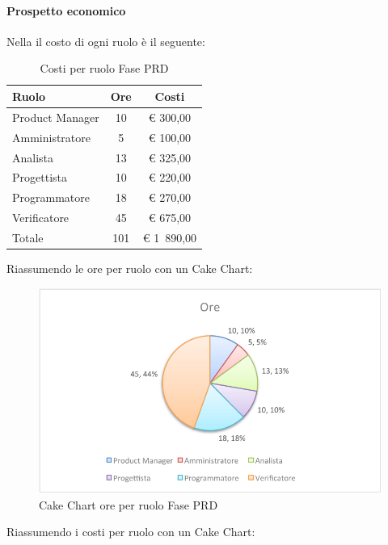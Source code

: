 			\paragraph{Prospetto economico}
				Nella  il costo di ogni ruolo è il seguente:
				\begin{table}[H]
					\begin{center}
						\begin{tabular}{| l | c | c |}
							\hline
							Ruolo 			& Ore 	& Costi  \\ \hline
							
							Product Manager	& 10 		& \euro{} 300,00 	\\
							Amministratore 		& 5 		& \euro{} 100,00 	\\
							Analista	 		& 13 		& \euro{} 325,00 	\\
							Progettista 		& 10 		& \euro{} 220,00  	\\
							Programmatore		& 18		& \euro{} 270,00 	\\
							Verificatore		& 45 		& \euro{} 675,00 	\\ \hline \hline
							
							Totale	 		& 101 	& \euro{} 1~890,00 	\\ \hline
						\end{tabular}
					\end{center}
					\caption{Costi per ruolo Fase PRD}
				\end{table}
				Riassumendo le ore per ruolo con un Cake Chart:
				\begin{figure}[H]\centering
					\includegraphics[width=\textwidth]{PianoDiProgetto/Pics/ChartTotOreFasePRD.pdf}
					\caption{Cake Chart ore per ruolo Fase PRD}
				\end{figure}
				Riassumendo i costi per ruolo con un Cake Chart:
